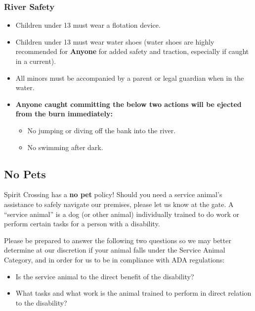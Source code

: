\subsubsection*{River Safety}
\begin{itemize}[noitemsep]
  \item Children under 13 must wear a flotation device.
  \item Children under 13 must wear water shoes (water shoes are highly recommended for  \textbf{Anyone} for added safety and traction, especially if caught in a current).
  \item All minors must be accompanied by a parent or legal guardian when in the water.
  \item \textbf{Anyone caught committing the below two actions will be ejected from the burn immediately:}
  \begin{itemize}[noitemsep]
    \item No jumping or diving off the bank into the river.
    \item No swimming after dark.
  \end{itemize}
\end{itemize}


\subsection*{No Pets}
\label{sub:nopets}

Spirit Crossing has a \textbf{no pet} policy!
%
Should you need a service animal’s assistance to safely navigate our premises, please let us know at the gate.  A ``service animal'' is a dog (or other animal) individually trained to do work or perform certain tasks for a person with a disability.

Please be prepared to answer the following two questions so we may better determine at our discretion if your animal falls under the Service Animal Category, and in order for us to be in compliance with ADA regulations:
%
\begin{itemize}[noitemsep]
\item Is the service animal to the direct benefit of the disability?
\item What tasks and what work is the animal trained to perform in direct relation to the disability? 
\end{itemize}
 
